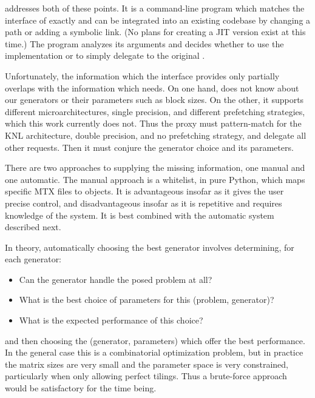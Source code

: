  addresses both of these points. It is a command-line program which matches the interface of  exactly and can be integrated into an existing codebase by changing a path or adding a symbolic link. (No plans for creating a JIT version exist at this time.) The program analyzes its arguments and decides whether to use the  implementation or to simply delegate to the original .

Unfortunately, the information which the  interface provides only partially overlaps with the information which  needs. On one hand,  does not know about our generators or their parameters such as block sizes. On the other, it supports different microarchitectures, single precision, and different prefetching strategies, which this work currently does not. Thus the proxy must pattern-match for the KNL architecture, double precision, and no prefetching strategy, and delegate all other requests. Then it must conjure the generator choice and its parameters.

There are two approaches to supplying the missing information, one manual and one automatic. The manual approach is a whitelist, in pure Python, which maps specific MTX files to  objects. It is advantageous insofar as it gives the user precise control, and disadvantageous insofar as it is repetitive and requires knowledge of the system. It is best combined with the automatic system described next.

In theory, automatically choosing the best generator involves determining, for each generator:
\begin{itemize}
  \item{Can the generator handle the posed problem at all?}
  \item{What is the best choice of parameters for this (problem, generator)?}
  \item{What is the expected performance of this choice?}
\end{itemize}
and then choosing the (generator, parameters) which offer the best performance. In the general case this is a combinatorial optimization problem, but in practice the matrix sizes are very small and the parameter space is very constrained, particularly when only allowing perfect tilings. Thus a brute-force approach would be satisfactory for the time being. 

